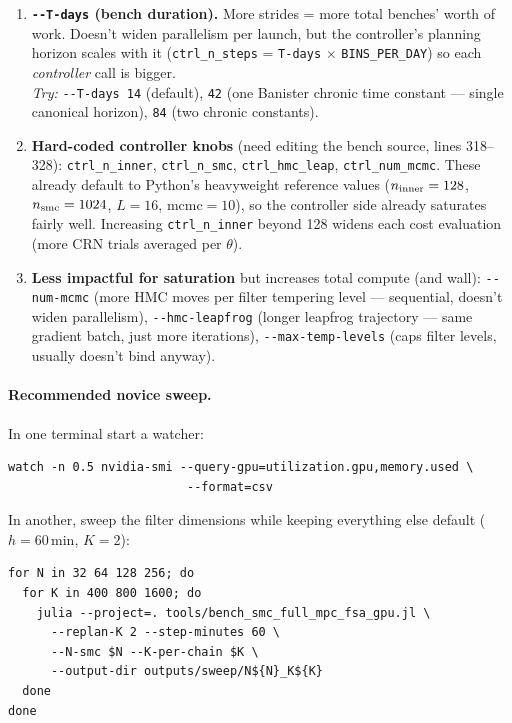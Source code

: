 \documentclass[11pt,a4paper]{article}
\begin{document}
\begin{enumerate}[itemsep=4pt,leftmargin=*]
\item \textbf{\texttt{-{}-T-days} (bench duration).} More strides =
  more total benches' worth of work. Doesn't widen parallelism per
  launch, but the controller's planning horizon scales with it
  (\texttt{ctrl\_n\_steps} = \texttt{T-days} $\times$ \texttt{BINS\_PER\_DAY})
  so each \emph{controller} call is bigger.\\
  \emph{Try:} \texttt{-{}-T-days 14} (default),
  \texttt{42} (one Banister chronic time constant — single canonical
  horizon), \texttt{84} (two chronic constants).

\item \textbf{Hard-coded controller knobs} (need editing the bench
  source, lines 318--328): \texttt{ctrl\_n\_inner}, \texttt{ctrl\_n\_smc},
  \texttt{ctrl\_hmc\_leap}, \texttt{ctrl\_num\_mcmc}. These already
  default to Python's heavyweight reference values
  ($n_{\rm inner}=128$, $n_{\rm smc}=1024$, $L=16$, mcmc$=10$), so
  the controller side already saturates fairly well.
  Increasing \texttt{ctrl\_n\_inner} beyond 128 widens each cost
  evaluation (more CRN trials averaged per $\theta$).

\item \textbf{Less impactful for saturation} but increases total
  compute (and wall): \texttt{-{}-num-mcmc} (more HMC moves per
  filter tempering level — sequential, doesn't widen parallelism),
  \texttt{-{}-hmc-leapfrog} (longer leapfrog trajectory — same gradient
  batch, just more iterations), \texttt{-{}-max-temp-levels} (caps
  filter levels, usually doesn't bind anyway).
\end{enumerate}

\paragraph{Recommended novice sweep.} In one terminal start a watcher:

\begin{verbatim}
watch -n 0.5 nvidia-smi --query-gpu=utilization.gpu,memory.used \
                         --format=csv
\end{verbatim}

In another, sweep the filter dimensions while keeping everything
else default ($h=60\,$min, $K=2$):

\begin{verbatim}
for N in 32 64 128 256; do
  for K in 400 800 1600; do
    julia --project=. tools/bench_smc_full_mpc_fsa_gpu.jl \
      --replan-K 2 --step-minutes 60 \
      --N-smc $N --K-per-chain $K \
      --output-dir outputs/sweep/N${N}_K${K}
  done
done
\end{verbatim}
\end{document}
